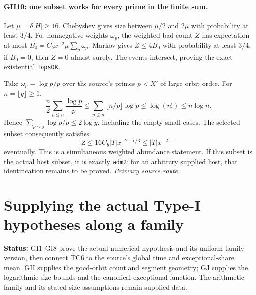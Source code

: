 \documentclass[11pt,a4paper]{article}
\numberwithin{equation}{section}
\theoremstyle{remark}\newtheorem{remark}[theorem]{Remark}
\newcommand{\status}[1]{\textbf{Status:} #1}
\begin{document}
\paragraph{GII10: one subset works for every prime in the finite sum.}
Let $\mu=\delta|H|\ge16$. Chebyshev gives size between $\mu/2$ and
$2\mu$ with probability at least $3/4$. For nonnegative weights
$\omega_p$, the weighted bad count $Z$ has expectation at most
$B_0=C_bx^{-2}\mu\sum_p\omega_p$. Markov gives $Z\le4B_0$ with
probability at least $3/4$; if $B_0=0$, then $Z=0$ almost surely.
The events intersect, proving the exact existential \texttt{TopsOK}.

Take $\omega_p=\log p/p$ over the source's primes $p<X'$ of large
orbit order. For $n=\lfloor y\rfloor\ge1$,
\[
 \frac n2\sum_{p\le n}\frac{\log p}{p}
 \le\sum_{p\le n}\lfloor n/p\rfloor\log p
 \le\log(n!)\le n\log n.
\]
Hence $\sum_{p<y}\log p/p\le2\log y$, including the empty small cases.
The selected subset consequently satisfies
\[
 Z\le16C_b|T|x^{-2+\epsilon/3}
   \le |T|x^{-2+\epsilon}\tag{GII.13}
\]
eventually. This is a simultaneous weighted abundance statement. If this
subset is the actual host subset, it is exactly \texttt{adm2}; for an
arbitrary supplied host, that identification remains to be proved.
\noindent\textit{Primary source route.}\cite{type-two-family}


\section{Supplying the actual Type-I hypotheses along a family}
\label{sec:type-one-family}

\status{GI1--GI8 prove the actual numerical hypothesis and its
uniform family version, then connect TC6 to the source's global
time and exceptional-share mean. GII supplies the good-orbit
count and segment geometry; GJ supplies the logarithmic size
bounds and the canonical exceptional function. The arithmetic
family and its stated size assumptions remain supplied data.}
\end{document}
